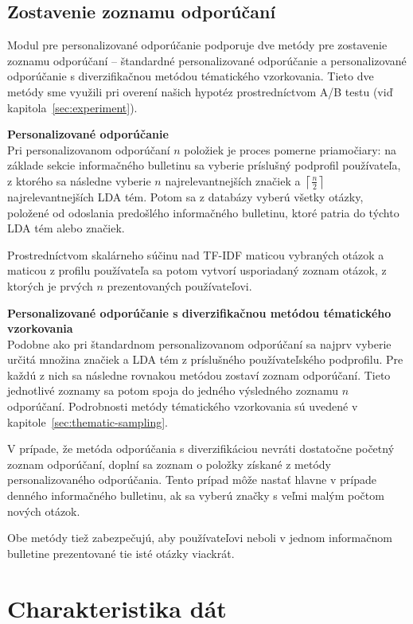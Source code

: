\subsection{Zostavenie zoznamu odporúčaní}

Modul pre personalizované odporúčanie podporuje dve metódy pre zostavenie zoznamu odporúčaní -- štandardné personalizované
odporúčanie a personalizované odporúčanie s diverzifikačnou metódou tématického vzorkovania. Tieto dve metódy sme využili
pri overení našich hypotéz prostredníctvom A/B testu (viď kapitola~\ref{sec:experiment}).

\textbf{Personalizované odporúčanie}\label{impl:pers-method}\\
Pri personalizovanom odporúčaní $n$ položiek je proces pomerne priamočiary: na základe sekcie informačného bulletinu
sa vyberie príslušný podprofil používateľa, z ktorého sa následne vyberie $n$ najrelevantnejších značiek
a $\left\lceil\frac{n}{2}\right\rceil$ najrelevantnejších LDA tém. Potom sa z databázy vyberú všetky otázky, položené
od odoslania predošlého informačného bulletinu, ktoré patria do týchto LDA tém alebo značiek.

Prostredníctvom skalárneho súčinu nad TF-IDF maticou vybraných otázok a maticou z profilu používateľa sa potom vytvorí
usporiadaný zoznam otázok, z ktorých je prvých $n$ prezentovaných používateľovi.

\textbf{Personalizované odporúčanie s diverzifikačnou metódou tématického vzorkovania}\\
Podobne ako pri štandardnom personalizovanom odporúčaní sa najprv vyberie určitá množina značiek a LDA tém z
príslušného používateľského podprofilu. Pre každú z nich sa následne rovnakou metódou zostaví zoznam odporúčaní.
Tieto jednotlivé zoznamy sa potom spoja do jedného výsledného zoznamu $n$ odporúčaní. Podrobnosti metódy tématického
vzorkovania sú uvedené v kapitole~\ref{sec:thematic-sampling}.

V prípade, že metóda odporúčania s diverzifikáciou nevráti dostatočne početný zoznam odporúčaní, doplní sa zoznam
o položky získané z metódy personalizovaného odporúčania. Tento prípad môže nastať hlavne v prípade denného informačného
bulletinu, ak sa vyberú značky s veľmi malým počtom nových otázok.

Obe metódy tiež zabezpečujú, aby používateľovi neboli v jednom informačnom bulletine prezentované tie isté otázky
viackrát.


\section{Charakteristika dát}

